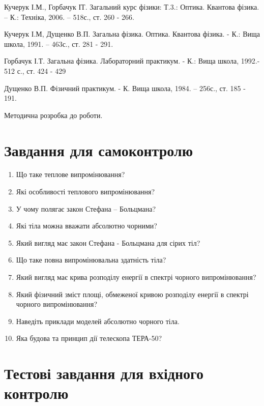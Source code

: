 \documentclass[twocolumn]{el-author}
\begin{document}
\begin{thebibliography}{}

Кучерук І.М., Горбачук ІТ. Загальний курс фізики: Т.3.: Оптика.
Квантова фізика. -- К.: Техніка, 2006. -- 518с., ст. 260 - 266.

Кучерук І.М, Дущенко В.П. Загальна фізика. Оптика. Квантова
фізика. - К.: Вища школа, 1991. -- 463с., ст. 281 - 291.

 Горбачук І.Т. Загальна фізика. Лабораторний практикум. - К.:
Вища школа, 1992.- 512 с., ст. 424 - 429

Дущенко В.П. Фізичний практикум. - К. Вища школа, 1984. --
256с., ст. 185 - 191.

Методична розробка до роботи.

\end{thebibliography}

\section{Завдання для самоконтролю}

\begin{enumerate}
	\item Що таке теплове випромінювання?
	\item Які особливості теплового випромінювання?
	\item У чому полягає закон Стефана -- Больцмана?
	\item Які тіла можна вважати абсолютно чорними?
	\item Який вигляд має закон Стефана - Больцмана для сірих тіл?
	\item Що таке повна випромінювальна здатність тіла?
	\item Який вигляд має крива розподілу енергії в спектрі чорного
випромінювання?
	\item Який фізичний зміст площі, обмеженої кривою розподілу енергії
в спектрі чорного випромінювання?
	\item Наведіть приклади моделей абсолютно чорного тіла.
	\item Яка будова та принцип дії телескопа ТЕРА-50?
\end{enumerate}

\newpage
\section{Тестові завдання для вхідного контролю}
\end{document}
